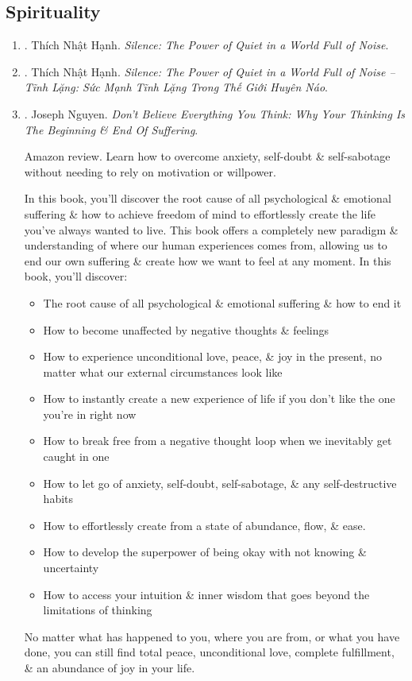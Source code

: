 \documentclass{article}
\begin{document}

\subsection{Spirituality}

\begin{enumerate}
	\item \cite{Hanh_silence}. {\sc Thích Nhật Hạnh}. {\it Silence: The Power of Quiet in a World Full of Noise}.

	\item \cite{Hanh_silence_VN}. {\sc Thích Nhật Hạnh}. {\it Silence: The Power of Quiet in a World Full of Noise -- Tĩnh Lặng: Sức Mạnh Tĩnh Lặng Trong Thế Giới Huyên Náo}.\hfill{\sf[done]}

	\item \cite{Nguyen_dont_believe_think}. {\sc Joseph Nguyen}. {\it Don't Believe Everything You Think: Why Your Thinking Is The Beginning \& End Of Suffering}. {}

	{\sf Amazon review.} Learn how to overcome anxiety, self-doubt \& self-sabotage without needing to rely on motivation or willpower.

	In this book, you'll discover the root cause of all psychological \& emotional suffering \& how to achieve freedom of mind to effortlessly create the life you've always wanted to live.  This book offers a completely new paradigm \& understanding of where our human experiences comes from, allowing us to end our own suffering \& create how we want to feel at any moment. In this book, you'll discover:
	\begin{itemize}
		\item The root cause of all psychological \& emotional suffering \& how to end it
		\item How to become unaffected by negative thoughts \& feelings
		\item How to experience unconditional love, peace, \& joy in the present, no matter what our external circumstances look like
		\item How to instantly create a new experience of life if you don't like the one you're in right now
		\item How to break free from a negative thought loop when we inevitably get caught in one
		\item How to let go of anxiety, self-doubt, self-sabotage, \& any self-destructive habits
		\item How to effortlessly create from a state of abundance, flow, \& ease.
		\item How to develop the superpower of being okay with not knowing \& uncertainty
		\item How to access your intuition \& inner wisdom that goes beyond the limitations of thinking
	\end{itemize}
	No matter what has happened to you, where you are from, or what you have done, you can still find total peace, unconditional love, complete fulfillment, \& an abundance of joy in your life.


\end{enumerate}
\end{document}
